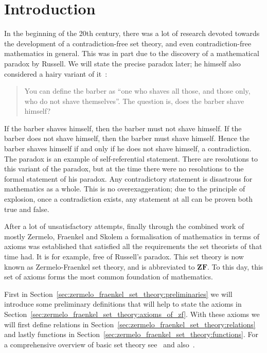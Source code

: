 \documentclass[../main.tex]{subfiles}
\begin{document}
\section*{Introduction}
In the beginning of the 20th century, there was a lot of research devoted towards the development of a contradiction-free set theory, and even contradiction-free mathematics in general. This was in part due to the discovery of a mathematical paradox by Russell. We will state the precise paradox later; he himself also considered a hairy variant of it~\cite{Russell2009}:
\begin{quote}
    You can define the barber as ``one who shaves all those, and those only, who do not shave themselves''. The question is, does the barber shave himself?
\end{quote}
If the barber shaves himself, then the barber must not shave himself. If the barber does not shave himself, then the barber must shave himself. Hence the barber shaves himself if and only if he does not shave himself, a contradiction. The paradox is an example of self-referential statement. There are resolutions to this variant of the paradox, but at the time there were no resolutions to the formal statement of his paradox. Any contradictory statement is disastrous for mathematics as a whole. This is no overexaggeration; due to the principle of explosion, once a contradiction exists, any statement at all can be proven both true and false.

After a lot of unsatisfactory attempts, finally through the combined work of mostly Zermelo, Fraenkel and Skolem a formalisation of mathematics in terms of axioms was established that satisfied all the requirements the set theorists of that time had. It is for example, free of Russell's paradox. This set theory is now known as Zermelo-Fraenkel set theory, and is abbreviated to $\mathbf{ZF}$. To this day, this set of axioms forms the most common foundation of mathematics.

First in Section~\ref{sec:zermelo_fraenkel_set_theory:preliminaries} we will introduce some preliminary definitions that will help to state the axioms in Section~\ref{sec:zermelo_fraenkel_set_theory:axioms_of_zf}. With these axioms we will first define relations in Section~\ref{sec:zermelo_fraenkel_set_theory:relations} and lastly functions in Section~\ref{sec:zermelo_fraenkel_set_theory:functions}. For a comprehensive overview of basic set theory see~\cite{Levy1979} and also~\cite{Kunen1992}.
\end{document}
